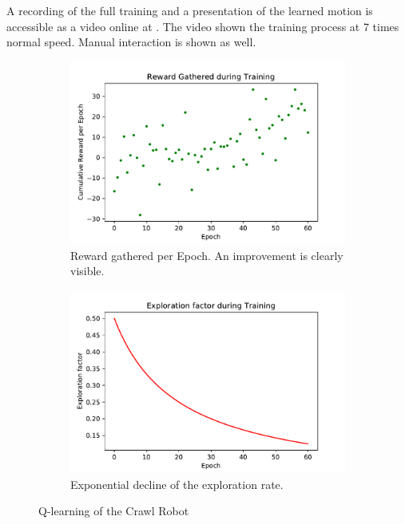 \documentclass[11pt, a4paper]{article}
\begin{document}
A recording of the full training and a presentation of the learned motion is accessible as a video online at \cite{youtube_crawl_training}. The video shown the training process at 7 times normal speed. Manual interaction is shown as well.

\begin{figure}
	\centering
	\begin{subfigure}{.48\textwidth}
		\centering
		\includegraphics[width=1\linewidth]{images/crawl_rewards}
		\caption{Reward gathered per Epoch. An improvement is clearly visible.}
		\label{fig:crawl_reward}
	\end{subfigure}
	\begin{subfigure}{.48\textwidth}
		\centering
		\includegraphics[width=1\linewidth]{images/crawl_exploration}
		\caption{Exponential decline of the exploration rate.}
		\label{fig:crawl_exploration}
	\end{subfigure}%
	\caption{Q-learning of the Crawl Robot}
	\label{fig:crawl_train}
\end{figure}
\end{document}
